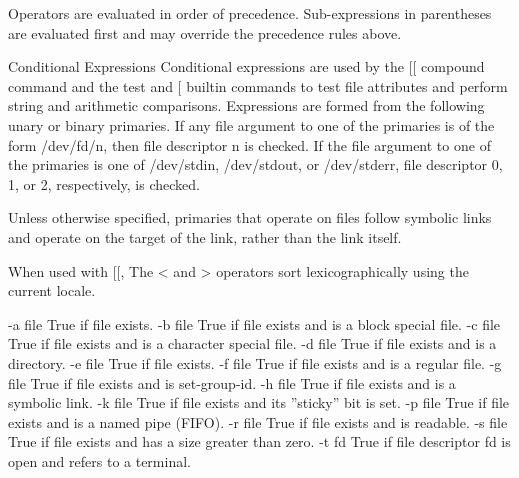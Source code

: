 \documentclass[11pt]{article}
\begin{document}
{{{Operators are evaluated in order of precedence. Sub-expressions in parentheses are evaluated first and may override the precedence rules above.

Conditional Expressions
Conditional expressions are used by the [[ compound command and the test and [ builtin commands to test file attributes and perform string and arithmetic comparisons. Expressions are formed from the following unary or binary primaries. If any file argument to one of the primaries is of the form /dev/fd/n, then file descriptor n is checked. If the file argument to one of the primaries is one of /dev/stdin, /dev/stdout, or /dev/stderr, file descriptor 0, 1, or 2, respectively, is checked.

Unless otherwise specified, primaries that operate on files follow symbolic links and operate on the target of the link, rather than the link itself.

When used with [[, The < and > operators sort lexicographically using the current locale.

-a file
True if file exists.
-b file
True if file exists and is a block special file.
-c file
True if file exists and is a character special file.
-d file
True if file exists and is a directory.
-e file
True if file exists.
-f file
True if file exists and is a regular file.
-g file
True if file exists and is set-group-id.
-h file
True if file exists and is a symbolic link.
-k file
True if file exists and its ''sticky'' bit is set.
-p file
True if file exists and is a named pipe (FIFO).
-r file
True if file exists and is readable.
-s file
True if file exists and has a size greater than zero.
-t fd
True if file descriptor fd is open and refers to a terminal.

}}}
\end{document}
